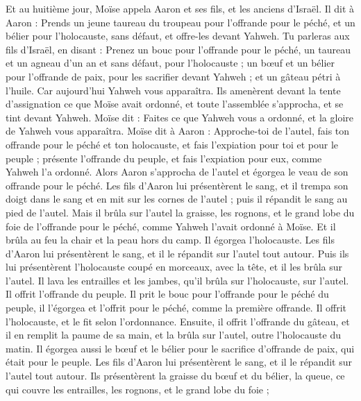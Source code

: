 \begin{multicols}{2}
\VerseOne{}Et au huitième jour, Moïse appela Aaron et ses fils, et les anciens d'Israël.
Il dit à Aaron : Prends un jeune taureau du troupeau pour l'offrande pour le péché, et un bélier pour l'holocauste, sans défaut, et offre-les devant Yahweh.
Tu parleras aux fils d'Israël, en disant : Prenez un bouc pour l'offrande pour le péché, un taureau et un agneau d'un an et sans défaut, pour l'holocauste ;
un bœuf et un bélier pour l’offrande de paix, pour les sacrifier devant Yahweh ; et un gâteau pétri à l'huile. Car aujourd'hui Yahweh vous apparaîtra.
Ils amenèrent devant la tente d'assignation ce que Moïse avait ordonné, et toute l'assemblée s'approcha, et se tint devant Yahweh.
Moïse dit : Faites ce que Yahweh vous a ordonné, et la gloire de Yahweh vous apparaîtra.
Moïse dit à Aaron : Approche-toi de l'autel, fais ton offrande pour le péché et ton holocauste, et fais l’expiation pour toi et pour le peuple ; présente l'offrande du peuple, et fais l’expiation pour eux, comme Yahweh l'a ordonné.
Alors Aaron s'approcha de l'autel et égorgea le veau de son offrande pour le péché.
Les fils d'Aaron lui présentèrent le sang, et il trempa son doigt dans le sang et en mit sur les cornes de l'autel ; puis il répandit le sang au pied de l'autel.
Mais il brûla sur l'autel la graisse, les rognons, et le grand lobe du foie de l'offrande pour le péché, comme Yahweh l'avait ordonné à Moïse.
Et il brûla au feu la chair et la peau hors du camp.
Il égorgea l'holocauste. Les fils d'Aaron lui présentèrent le sang, et il le répandit sur l'autel tout autour.
Puis ils lui présentèrent l'holocauste coupé en morceaux, avec la tête, et il les brûla sur l'autel.
Il lava les entrailles et les jambes, qu'il brûla sur l'holocauste, sur l'autel.
Il offrit l'offrande du peuple. Il prit le bouc pour l'offrande pour le péché du peuple, il l'égorgea et l'offrit pour le péché, comme la première offrande.
Il offrit l’holocauste, et le fit selon l'ordonnance.
Ensuite, il offrit l’offrande du gâteau, et il en remplit la paume de sa main, et la brûla sur l'autel, outre l'holocauste du matin.
Il égorgea aussi le bœuf et le bélier pour le sacrifice d’offrande de paix, qui était pour le peuple. Les fils d'Aaron lui présentèrent le sang, et il le répandit sur l'autel tout autour.
Ils présentèrent la graisse du bœuf et du bélier, la queue, ce qui couvre les entrailles, les rognons, et le grand lobe du foie ;

\end{multicols}
